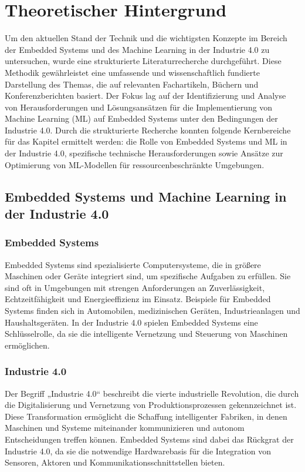 \chapter{Theoretischer Hintergrund}
\label{chap:theoretische_hintergrund}

Um den aktuellen Stand der Technik und die wichtigsten Konzepte im Bereich der Embedded Systems und des Machine Learning in der Industrie 4.0 zu untersuchen, wurde eine strukturierte Literaturrecherche durchgeführt. Diese Methodik gewährleistet eine umfassende und wissenschaftlich fundierte Darstellung des Themas, die auf relevanten Fachartikeln, Büchern und Konferenzberichten basiert. Der Fokus lag auf der Identifizierung und Analyse von Herausforderungen und Lösungsansätzen für die Implementierung von Machine Learning (ML) auf Embedded Systems unter den Bedingungen der Industrie 4.0. Durch die strukturierte Recherche konnten folgende Kernbereiche für das Kapitel ermittelt werden: die Rolle von Embedded Systems und ML in der Industrie 4.0, spezifische technische Herausforderungen sowie Ansätze zur Optimierung von ML-Modellen für ressourcenbeschränkte Umgebungen.

\section{Embedded Systems und Machine Learning in der Industrie 4.0}

\subsection{Embedded Systems}

Embedded Systems sind spezialisierte Computersysteme, die in größere Maschinen oder Geräte integriert sind, um spezifische Aufgaben zu erfüllen. Sie sind oft in Umgebungen mit strengen Anforderungen an Zuverlässigkeit, Echtzeitfähigkeit und Energieeffizienz im Einsatz. Beispiele für Embedded Systems finden sich in Automobilen, medizinischen Geräten, Industrieanlagen und Haushaltsgeräten. In der Industrie 4.0 spielen Embedded Systems eine Schlüsselrolle, da sie die intelligente Vernetzung und Steuerung von Maschinen ermöglichen.

\subsection{Industrie 4.0}

Der Begriff „Industrie 4.0“ beschreibt die vierte industrielle Revolution, die durch die Digitalisierung und Vernetzung von Produktionsprozessen gekennzeichnet ist. Diese Transformation ermöglicht die Schaffung intelligenter Fabriken, in denen Maschinen und Systeme miteinander kommunizieren und autonom Entscheidungen treffen können. Embedded Systems sind dabei das Rückgrat der Industrie 4.0, da sie die notwendige Hardwarebasis für die Integration von Sensoren, Aktoren und Kommunikationsschnittstellen bieten.

